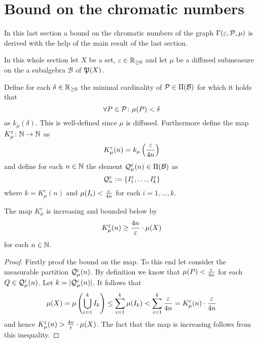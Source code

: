 \section{Bound on the chromatic numbers}\label{sec:bounds}

In this last section a bound on the chromatic numbers of the graph $\Gamma(\varepsilon, \P, \mu)$ is derived with the help of the main result of the last section.

In this whole section let $X$ be a set, $\varepsilon \in \R_{\geq 0}$ and let $\mu$ be a diffused submeasure on the a subalgebra $\mathcal{B}$ of $\PowS(X)$.

\begin{defin}
  Define for each $\delta \in \R_{\geq 0}$ the minimal cardinality of $\P \in \Pi(\mathcal{B})$ for which it holds that \[\forall P \in \P\colon \mu(P) < \delta\] as $k_\mu(\delta)$. This is well-defined since $\mu$ is diffused.
  Furthermore define the map $K_\mu^\varepsilon\colon \N \to \N$ as \[K_\mu^\varepsilon(n) = k_\mu\left({\varepsilon \over {4n}}\right)\] and define for each $n \in \N$ the element $\Q_\mu^\varepsilon(n) \in \Pi(\mathcal{B})$ as \[\Q_n^\varepsilon := \{I_1^\varepsilon,\ldots, I^\varepsilon_k\}\] where $k = {K_\mu^\varepsilon(n)}$ and $\mu(I_i) < {\varepsilon \over 4n}$ for each $i=1, \ldots, k$.
\end{defin}

\begin{rem}\label{rem:appr}
  The map $K_\mu^\varepsilon$ is increasing and bounded below by \[K^\varepsilon_\mu(n) \geq {4n \over \varepsilon} \cdot \mu(X)\] for each $n\in \N$.
\end{rem}


\begin{proof}
  Firstly proof the bound on the map. To this end let consider the measurable partition $\Q_\mu^\varepsilon(n)$. By definition we know that $\mu(P) <  {\varepsilon \over 4n}$ for each $Q \in \Q_\mu^\varepsilon(n)$. Let $k = |\Q_\mu^\varepsilon(n)|$.
  It follows that
  \begin{equation*}
    \mu(X) = \mu\left(\bigcup_{i=1}^k I_k\right) \leq \sum\limits_{i=1}^k \mu(I_k) < \sum\limits_{i=1}^k{\varepsilon \over 4n} = K_\mu^\varepsilon(n) \cdot {\varepsilon \over 4n}
  \end{equation*}
  and hence $K_\mu^\varepsilon(n) > {4n \over \varepsilon} \cdot \mu(X)$. The fact that the map is increasing follows from this inequality.
\end{proof}

